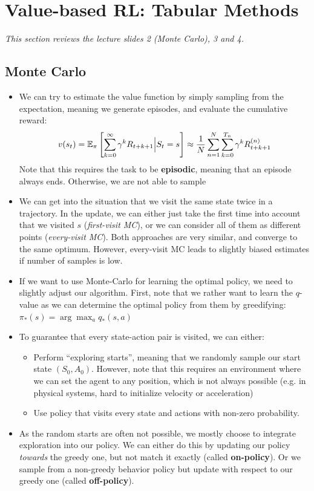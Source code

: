 \section{Value-based RL: Tabular Methods}
\textit{This section reviews the lecture slides 2 (Monte Carlo), 3 and 4.}
\subsection{Monte Carlo}
\begin{itemize}
	\item We can try to estimate the value function by simply sampling from the expectation, meaning we generate episodes, and evaluate the cumulative reward:
	$$v(s_t)=\mathbb{E}_{\pi}\left[\sum_{k=0}^{\infty} \gamma^k R_{t+k+1}\Big\vert S_t=s\right]\approx \frac{1}{N}\sum_{n=1}^{N}\sum_{k=0}^{T_{n}}\gamma^k R_{t+k+1}^{(n)}$$
	Note that this requires the task to be \textbf{episodic}, meaning that an episode always ends. Otherwise, we are not able to sample 
	\item We can get into the situation that we visit the same state twice in a trajectory. In the update, we can either just take the first time into account that we visited $s$ (\textit{first-visit MC}), or we can consider all of them as different points (\textit{every-visit MC}). Both approaches are very similar, and converge to the same optimum. However, every-visit MC leads to slightly biased estimates if number of samples is low.
	\item If we want to use Monte-Carlo for learning the optimal policy, we need to slightly adjust our algorithm. First, note that we rather want to learn the $q$-value as we can determine the optimal policy from them by greedifying: $\pi_{*}(s)=\arg\max_a q_{*}(s,a)$
	\item To guarantee that every state-action pair is visited, we can either:
	\begin{itemize}
		\item Perform ``exploring starts'', meaning that we randomly sample our start state $(S_0,A_0)$. However, note that this requires an environment where we can set the agent to any position, which is not always possible (e.g. in physical systems, hard to initialize velocity or acceleration)
		\item Use policy that visits every state and actions with non-zero probability. 
	\end{itemize}
	\item As the random starts are often not possible, we mostly choose to integrate exploration into our policy. We can either do this by updating our policy \textit{towards} the greedy one, but not match it exactly (called \textbf{on-policy}). Or we sample from a non-greedy behavior policy but update with respect to our greedy one (called \textbf{off-policy}).
\end{itemize}
